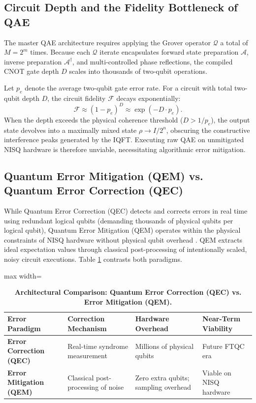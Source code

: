 \subsection{Circuit Depth and the Fidelity Bottleneck of QAE}
The master QAE architecture requires applying the Grover operator $\mathcal{Q}$ a total of $M = 2^m$ times. Because each $\mathcal{Q}$ iterate encapsulates forward state preparation $\mathcal{A}$, inverse preparation $\mathcal{A}^\dagger$, and multi-controlled phase reflections, the compiled CNOT gate depth $D$ scales into thousands of two-qubit operations.

Let $p_e$ denote the average two-qubit gate error rate. For a circuit with total two-qubit depth $D$, the circuit fidelity $\mathcal{F}$ decays exponentially:
\begin{equation}
\mathcal{F} \approx (1 - p_e)^D \approx \exp(-D \cdot p_e).
\label{eq:circuit_fidelity_decay_ch3}
\end{equation}
When the depth exceeds the physical coherence threshold ($D > 1/p_e$), the output state devolves into a maximally mixed state $\rho \to I / 2^n$, obscuring the constructive interference peaks generated by the IQFT. Executing raw QAE on unmitigated NISQ hardware is therefore unviable, necessitating algorithmic error mitigation.

\subsection{Quantum Error Mitigation (QEM) vs. Quantum Error Correction (QEC)}
While Quantum Error Correction (QEC) detects and corrects errors in real time using redundant logical qubits (demanding thousands of physical qubits per logical qubit), Quantum Error Mitigation (QEM) operates within the physical constraints of NISQ hardware without physical qubit overhead \cite{endo2018}. QEM extracts ideal expectation values through classical post-processing of intentionally scaled, noisy circuit executions. Table \ref{tab:qec_vs_qem} contrasts both paradigms.

\begin{table}[htbp]
\centering
\caption{\textbf{Architectural Comparison: Quantum Error Correction (QEC) vs. Error Mitigation (QEM).}}
\label{tab:qec_vs_qem}
\begin{adjustbox}{max width=\textwidth}
\small
\begin{tabularx}{\textwidth}{>{\bfseries}lXXX}
\toprule
\textbf{Error Paradigm} & \textbf{Correction Mechanism} & \textbf{Hardware Overhead} & \textbf{Near-Term Viability} \\
\midrule
Error Correction (QEC) & Real-time syndrome measurement & Millions of physical qubits & Future FTQC era \\
Error Mitigation (QEM) & Classical post-processing of noise & Zero extra qubits; sampling overhead & Viable on NISQ hardware \\
\bottomrule
\end{tabularx}
\end{adjustbox}
\end{table}

